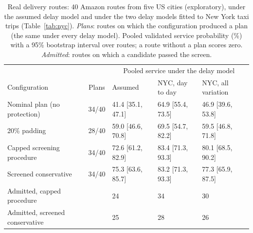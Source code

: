 \begin{table}[t]
\centering
\small
\setlength{\tabcolsep}{4pt}
\caption{Real delivery routes: 40 Amazon routes from five US cities (exploratory), under the assumed delay model and under the two delay models fitted to New York taxi trips (Table~\ref{tab:nyc}). \emph{Plans}: routes on which the configuration produced a plan (the same under every delay model). Pooled validated service probability (\%) with a 95\% bootstrap interval over routes; a route without a plan scores zero. \emph{Admitted}: routes on which a candidate passed the screen.}
\label{tab:amazon}
\begin{tabular}{@{}lclll@{}}
\toprule
 & & \multicolumn{3}{c}{Pooled service under the delay model} \\
Configuration & Plans & Assumed & NYC, day to day & NYC, all variation\\
\midrule
Nominal plan (no protection) & 34/40 & 41.4 [35.1, 47.1] & 64.9 [55.4, 73.5] & 46.9 [39.6, 53.8]\\
20\% padding & 28/40 & 59.0 [46.6, 70.8] & 69.5 [54.7, 82.2] & 59.5 [46.8, 71.8]\\
Capped screening procedure & 34/40 & 72.6 [61.2, 82.9] & 83.4 [71.3, 93.3] & 80.1 [68.5, 90.2]\\
Screened conservative & 34/40 & 75.3 [63.6, 85.7] & 83.2 [71.3, 93.3] & 77.3 [65.9, 87.5]\\
\midrule
Admitted, capped procedure & & 24 & 34 & 30\\
Admitted, screened conservative & & 25 & 28 & 26\\
\bottomrule
\end{tabular}
\end{table}
